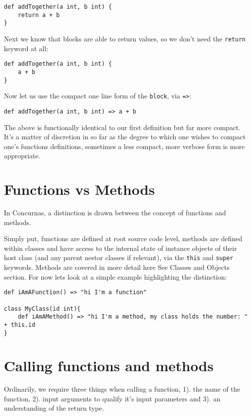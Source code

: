 \documentclass[conc-doc]{subfiles}
\begin{document}
\begin{lstlisting}
def addTogether(a int, b int) {
	return a + b
}
\end{lstlisting}

Next we know that blocks are able to return values, so we don't need the \lstinline{return} keyword at all:

\begin{lstlisting}
def addTogether(a int, b int) {
	a + b
}
\end{lstlisting}

Now let us use the compact one line form of the \lstinline{block}, via \lstinline{=>}:

\begin{lstlisting}
def addTogether(a int, b int) => a + b
\end{lstlisting}

The above is functionally identical to our first definition but far more compact. It's a matter of discretion in so far as the degree to which one wishes to compact one's functions definitions, sometimes a less compact, more verbose form is more appropriate.

\section{Functions vs Methods}
In Concurnas, a distinction is drawn between the concept of functions and methods.

Simply put, functions are defined at root source code level, methods are defined within classes and have access to the internal state of instance objects of their host class (and any parent nestor classes if relevant), via the \lstinline{this} and \lstinline{super} keywords. Methods are covered in more detail here See Classes and Objects section. For now lets look at a simple example highlighting the distinction:


\begin{lstlisting}
def iAmAFunction() => "hi I'm a function"

class MyClass(id int){
	def iAmAMethod() => "hi I'm a method, my class holds the number: " + this.id
}
\end{lstlisting}

\section{Calling functions and methods}
Ordinarily, we require three things when calling a function, 1). the name of the function, 2). input arguments to qualify it's input parameters and 3). an understanding of the return type.
\end{document}
